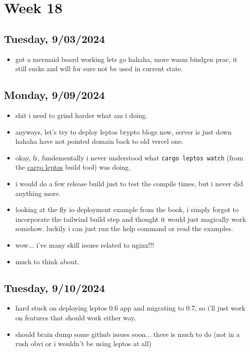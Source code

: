 \newpage
\section{Week 18}

\subsection*{Tuesday, 9/03/2024}
\begin{itemize}
    \item got a mermaid board working lets go hahaha, more wasm bindgen prac, it
        still sucks and will for sure not be used in current state.
\end{itemize}

\subsection*{Monday, 9/09/2024}
\begin{itemize}
    \item shit i need to grind harder what am i doing.
    \item anyways, let's try to deploy leptos brypto blogs now, server is just
        down hahaha have not pointed domain back to old vercel one.
    \item okay, fr, fundementally i never understood what \texttt{cargo leptos
        watch} (from the  
        \textcolor{blue}{\href{https://github.com/leptos-rs/cargo-leptos}{cargo leptos}}
        build tool) was doing.
    \item i would do a few release build just to test the compile times, but i
        never did anything more.
    \item looking at the fly io deployment example from the book, i simply
        forgot to incorporate the tailwind build step and thought it would just
        magically work somehow. luckily i can just run the help command or read
        the examples.
    \item wow... i've many skill issues related to nginx!!!
    \item much to think about.
\end{itemize}

\subsection*{Tuesday, 9/10/2024}
\begin{itemize}
    \item hard stuck on deploying leptos 0.6 app and migrating to 0.7, so i'll
        just work on features that should work either way.
    \item should brain dump some github issues soon... there is much to do (not 
        in a rush obvi or i wouldn't be using leptos at all)
\end{itemize}

